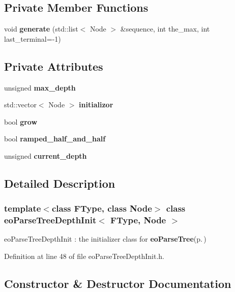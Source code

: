 \subsection*{Private Member Functions}
\begin{CompactItemize}
\item 
void {\bf generate} (std::list$<$ Node $>$ \&sequence, int the\_\-max, int last\_\-terminal=-1)\label{classeo_parse_tree_depth_init_d0}

\end{CompactItemize}
\subsection*{Private Attributes}
\begin{CompactItemize}
\item 
unsigned {\bf max\_\-depth}\label{classeo_parse_tree_depth_init_r0}

\item 
std::vector$<$ Node $>$ {\bf initializor}\label{classeo_parse_tree_depth_init_r1}

\item 
bool {\bf grow}\label{classeo_parse_tree_depth_init_r2}

\item 
bool {\bf ramped\_\-half\_\-and\_\-half}\label{classeo_parse_tree_depth_init_r3}

\item 
unsigned {\bf current\_\-depth}\label{classeo_parse_tree_depth_init_r4}

\end{CompactItemize}


\subsection{Detailed Description}
\subsubsection*{template$<$class FType, class Node$>$ class eo\-Parse\-Tree\-Depth\-Init$<$ FType, Node $>$}

eo\-Parse\-Tree\-Depth\-Init : the initializer class for {\bf eo\-Parse\-Tree}{\rm (p.\,\pageref{classeo_parse_tree})} 



Definition at line 48 of file eo\-Parse\-Tree\-Depth\-Init.h.

\subsection{Constructor \& Destructor Documentation}
